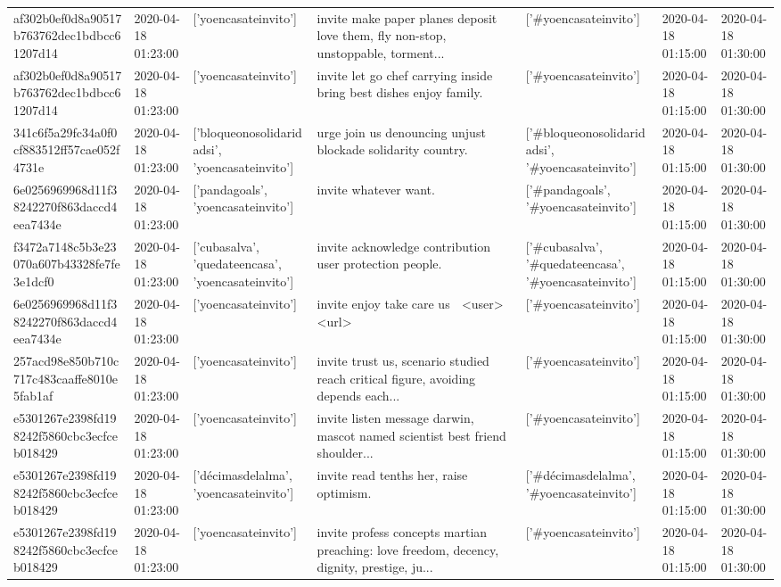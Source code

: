 \begin{tabular}{lllllll}
af302b0ef0d8a90517b763762dec1bdbcc61207d14 & 2020-04-18 01:23:00 & ['yoencasateinvito'] & invite make paper planes deposit love them, fly non-stop, unstoppable, torment... & ['#yoencasateinvito'] & 2020-04-18 01:15:00 & 2020-04-18 01:30:00 \\
af302b0ef0d8a90517b763762dec1bdbcc61207d14 & 2020-04-18 01:23:00 & ['yoencasateinvito'] & invite let go chef carrying inside bring best dishes enjoy family. & ['#yoencasateinvito'] & 2020-04-18 01:15:00 & 2020-04-18 01:30:00 \\
341c6f5a29fc34a0f0cf883512ff57cae052f4731e & 2020-04-18 01:23:00 & ['bloqueonosolidaridadsi', 'yoencasateinvito'] & urge join us denouncing unjust blockade solidarity country. & ['#bloqueonosolidaridadsi', '#yoencasateinvito'] & 2020-04-18 01:15:00 & 2020-04-18 01:30:00 \\
6e0256969968d11f38242270f863daccd4eea7434e & 2020-04-18 01:23:00 & ['pandagoals', 'yoencasateinvito'] & invite whatever want. & ['#pandagoals', '#yoencasateinvito'] & 2020-04-18 01:15:00 & 2020-04-18 01:30:00 \\
f3472a7148c5b3e23070a607b43328fe7fe3e1dcf0 & 2020-04-18 01:23:00 & ['cubasalva', 'quedateencasa', 'yoencasateinvito'] & invite acknowledge contribution user protection people. & ['#cubasalva', '#quedateencasa', '#yoencasateinvito'] & 2020-04-18 01:15:00 & 2020-04-18 01:30:00 \\
6e0256969968d11f38242270f863daccd4eea7434e & 2020-04-18 01:23:00 & ['yoencasateinvito'] & invite enjoy take care us 🌹 <user> <url> & ['#yoencasateinvito'] & 2020-04-18 01:15:00 & 2020-04-18 01:30:00 \\
257acd98e850b710c717c483caaffe8010e5fab1af & 2020-04-18 01:23:00 & ['yoencasateinvito'] & invite trust us, scenario studied reach critical figure, avoiding depends each... & ['#yoencasateinvito'] & 2020-04-18 01:15:00 & 2020-04-18 01:30:00 \\
e5301267e2398fd198242f5860cbc3ecfceb018429 & 2020-04-18 01:23:00 & ['yoencasateinvito'] & invite listen message darwin, mascot named scientist best friend shoulder... & ['#yoencasateinvito'] & 2020-04-18 01:15:00 & 2020-04-18 01:30:00 \\
e5301267e2398fd198242f5860cbc3ecfceb018429 & 2020-04-18 01:23:00 & ['décimasdelalma', 'yoencasateinvito'] & invite read tenths her, raise optimism. & ['#décimasdelalma', '#yoencasateinvito'] & 2020-04-18 01:15:00 & 2020-04-18 01:30:00 \\
e5301267e2398fd198242f5860cbc3ecfceb018429 & 2020-04-18 01:23:00 & ['yoencasateinvito'] & invite profess concepts martian preaching: love freedom, decency, dignity, prestige, ju... & ['#yoencasateinvito'] & 2020-04-18 01:15:00 & 2020-04-18 01:30:00 \\

\end{tabular}
